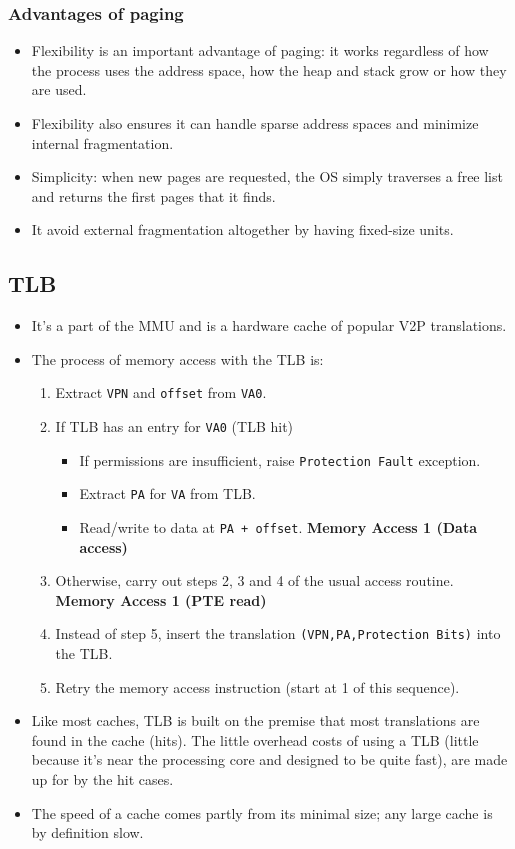 \documentclass[10pt]{report}
\begin{document}
\subsubsection{Advantages of paging}
\begin{itemize}
    \item Flexibility is an important advantage of paging: it works 
    regardless of how the process uses the address space, how the heap and stack grow or how they are used.
    \item Flexibility also ensures it can handle sparse address spaces and minimize internal fragmentation.
    \item Simplicity: when new pages are requested, the OS simply
    traverses a free list and returns the first pages that it finds.
    \item It avoid external fragmentation altogether by having fixed-size units.
\end{itemize}
\subsection{TLB}
\begin{itemize}
    \item It's a part of the MMU and is a hardware cache of popular V2P translations.
    \item The process of memory access with the TLB is:
    \begin{enumerate}
    \item Extract \texttt{VPN} and \texttt{offset} from \texttt{VA0}.
    \item If TLB has an entry for \texttt{VA0} (TLB hit)
    \begin{itemize}
        \item If permissions are insufficient, raise \texttt{Protection Fault} exception.
        \item Extract \texttt{PA} for \texttt{VA} from TLB.
        \item Read/write to data at \texttt{PA + offset}. \hfill \textbf{Memory Access 1 (Data access)}
    \end{itemize}
    \item Otherwise, carry out steps 2, 3 and 4 of the usual access routine. \hfill \textbf{Memory Access 1 (PTE read)}
    \item Instead of step 5, insert the translation \texttt{(VPN,PA,Protection Bits)} into the TLB.
    \item Retry the memory access instruction (start at 1 of this sequence).
    \end{enumerate}
    \item Like most caches, TLB is built on the premise that most 
    translations are found in the cache (hits). The little overhead 
    costs of using a TLB (little because it's near the processing 
    core and designed to be quite fast), are made up for by the hit cases. 
    \item The speed of a cache comes partly from its minimal size; any large cache is by definition slow.
\end{itemize}
\end{document}
